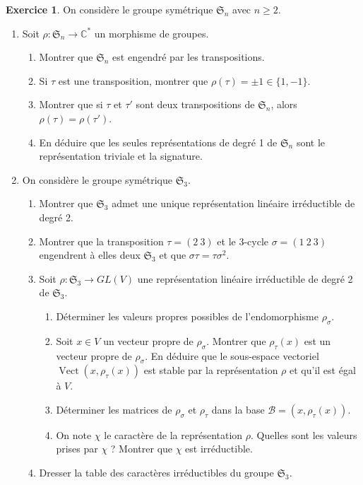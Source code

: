 \documentclass[french]{book}
\theoremstyle{definition}
\newtheorem{exo}{Exercice}
\begin{document}
\begin{exo}
  On considère le groupe symétrique \(\mathfrak{S}_n\) avec \(n \geq 2\).

  \begin{enumerate}
    \item Soit \(\rho : \mathfrak{S}_n \longrightarrow \mathbb{C}^{*}\) un morphisme de groupes.
    \begin{enumerate}
      \item Montrer que \(\mathfrak{S}_n\) est engendré par les transpositions.
      \item Si \(\tau\) est une transposition, montrer que \(\rho(\tau) = \pm 1 \in \{1, -1\}\).
      \item Montrer que si \(\tau\) et \(\tau'\) sont deux transpositions de \(\mathfrak{S}_n\), alors \(\rho(\tau) = \rho(\tau')\).
      \item En déduire que les seules représentations de degré 1 de \(\mathfrak{S}_n\) sont le représentation triviale et la signature.
    \end{enumerate}

    \item On considère le groupe symétrique \(\mathfrak{S}_{3}\).
    \begin{enumerate}
      \item Montrer que \(\mathfrak{S}_{3}\) admet une unique représentation linéaire irréductible de degré 2.
      \item Montrer que la transposition \(\tau = (2 \ 3)\) et le 3-cycle \(\sigma = (1 \ 2 \ 3)\) engendrent à elles deux \(\mathfrak{S}_{3}\) et que \(\sigma \tau = \tau \sigma^2\).
      \item Soit \(\rho : \mathfrak{S}_{3} \longrightarrow GL(V)\) une représentation linéaire irréductible de degré 2 de \(\mathfrak{S}_{3}\).
      \begin{enumerate}
        \item Déterminer les valeurs propres possibles de l'endomorphisme \(\rho _{\sigma}\).
        \item Soit \(x \in V\) un vecteur propre de \(\rho _{\sigma}\). Montrer que \(\rho _{\tau}(x)\) est un vecteur propre de \(\rho _{\sigma}\). En déduire que le sous-espace vectoriel \(\operatorname{Vect}(x, \rho _{\tau}(x))\) est stable par la représentation \(\rho\) et qu'il est égal à \(V\).
        \item Déterminer les matrices de \(\rho _{\sigma}\) et \(\rho _{\tau}\) dans la base \(\mathcal{B} = (x, \rho _{\tau}(x))\).
        \item On note \(\chi\) le caractère de la représentation \(\rho\). Quelles sont les valeurs prises par \(\chi\) ? Montrer que \(\chi\) est irréductible.
      \end{enumerate}
      \item Dresser la table des caractères irréductibles du groupe \(\mathfrak{S}_{3}\).
    \end{enumerate}
  \end{enumerate}
\end{exo}
\end{document}
